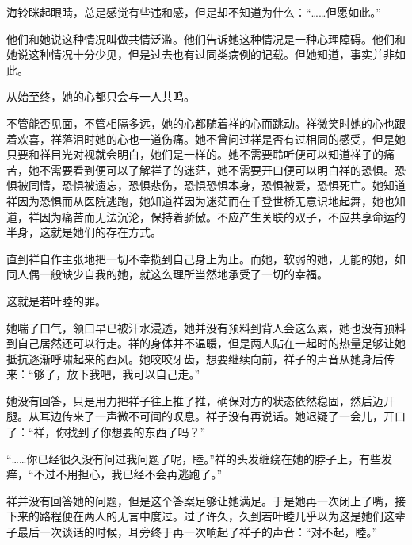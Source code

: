 \documentclass{article}
\begin{document}
海铃眯起眼睛，总是感觉有些违和感，但是却不知道为什么：“……但愿如此。”



\newpage



他们和她说这种情况叫做共情泛滥。他们告诉她这种情况是一种心理障碍。他们和她说这种情况十分少见，但是过去也有过同类病例的记载。但她知道，事实并非如此。



从始至终，她的心都只会与一人共鸣。



不管能否见面，不管相隔多远，她的心都随着祥的心而跳动。祥微笑时她的心也跟着欢喜，祥落泪时她的心也一道伤痛。她不曾问过祥是否有过相同的感受，但是她只要和祥目光对视就会明白，她们是一样的。她不需要聆听便可以知道祥子的痛苦，她不需要看到便可以了解祥子的迷茫，她不需要开口便可以明白祥的恐惧。恐惧被同情，恐惧被遗忘，恐惧悲伤，恐惧恐惧本身，恐惧被爱，恐惧死亡。她知道祥因为恐惧而从医院逃跑，她知道祥因为迷茫而在千登世桥无意识地起舞，她也知道，祥因为痛苦而无法沉沦，保持着骄傲。不应产生关联的双子，不应共享命运的半身，这就是她们的存在方式。



直到祥自作主张地把一切不幸揽到自己身上为止。而她，软弱的她，无能的她，如同人偶一般缺少自我的她，就这么理所当然地承受了一切的幸福。



这就是若叶睦的罪。



她喘了口气，领口早已被汗水浸透，她并没有预料到背人会这么累，她也没有预料到自己居然还可以行走。祥的身体并不温暖，但是两人贴在一起时的热量足够让她抵抗逐渐呼啸起来的西风。她咬咬牙齿，想要继续向前，祥子的声音从她身后传来：“够了，放下我吧，我可以自己走。”



她没有回答，只是用力把祥子往上推了推，确保对方的状态依然稳固，然后迈开腿。从耳边传来了一声微不可闻的叹息。祥子没有再说话。她迟疑了一会儿，开口了：“祥，你找到了你想要的东西了吗？”



“……你已经很久没有问过我问题了呢，睦。”祥的头发缠绕在她的脖子上，有些发痒，“不过不用担心，我已经不会再逃跑了。”



祥并没有回答她的问题，但是这个答案足够让她满足。于是她再一次闭上了嘴，接下来的路程便在两人的无言中度过。过了许久，久到若叶睦几乎以为这是她们这辈子最后一次谈话的时候，耳旁终于再一次响起了祥子的声音：“对不起，睦。”
\end{document}
